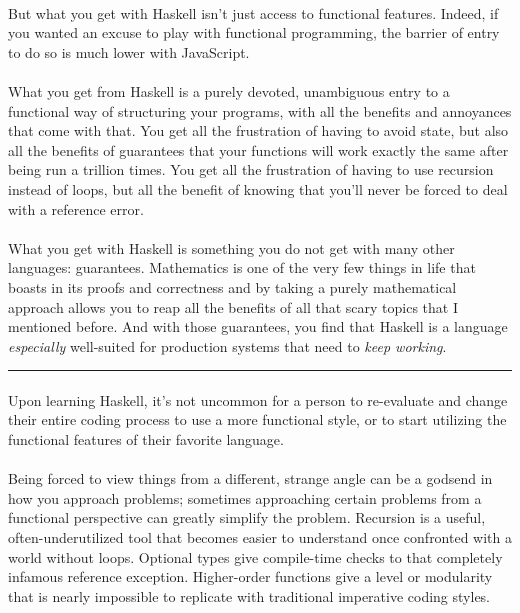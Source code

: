 \begin{foreword}
\paragraph{}
But what you get with Haskell isn't just access to functional features.  Indeed, if you wanted an excuse to play with functional programming, the barrier of entry to do so is much lower with JavaScript.  

\paragraph{}
What you get from Haskell is a purely devoted, unambiguous entry to a functional way of structuring your programs, with all the benefits and annoyances that come with that. You get all the frustration of having to avoid state, but also all the benefits of guarantees that your functions will work exactly the same after being run a trillion times. You get all the frustration of having to use recursion instead of loops, but all the benefit of knowing that you'll never be forced to deal with a  reference error. 

\paragraph{}
What you get with Haskell is something you do not get with many other languages: guarantees. Mathematics is one of the very few things in life that boasts in its proofs and correctness and by taking a purely mathematical approach allows you to reap all the benefits of all that scary topics that I mentioned before. 
And with those guarantees, you find that Haskell is a language \textit{especially} well-suited for production systems that need to \textit{keep working}.  

\rule{330pt}{1pt}

\paragraph{}
Upon learning Haskell, it's not uncommon for a person to re-evaluate and change their entire coding process to use a more functional style, or to start utilizing the functional features of their favorite language. 

\paragraph{}
Being forced to view things from a different, strange angle can be a godsend in how you approach problems; sometimes approaching certain problems from a functional perspective can greatly simplify the problem. Recursion is a useful, often-underutilized tool that becomes easier to understand once confronted with a world without loops. Optional types give compile-time checks to that completely infamous  reference exception. Higher-order functions give a level or modularity that is nearly impossible to replicate with traditional imperative coding styles. 


\end{foreword}
